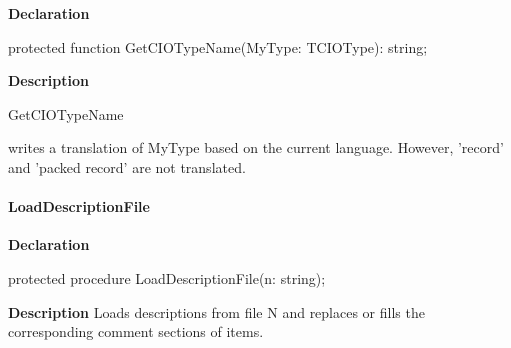 \documentclass{report}
\newif\ifpdf
\begin{document}
\label{PasDoc_Gen.TDocGenerator-GetCIOTypeName}
\begin{list}{}{
\setlength{\itemindent}{0cm}
\setlength{\listparindent}{0cm}
\setlength{\leftmargin}{\evensidemargin}
\addtolength{\leftmargin}{\tmplength}
\settowidth{\labelsep}{X}
\addtolength{\leftmargin}{\labelsep}
\setlength{\labelwidth}{\tmplength}
}
\item[\textbf{Declaration}\hfill]
\ifpdf
\begin{flushleft}
\fi
\begin{ttfamily}
protected function GetCIOTypeName(MyType: TCIOType): string;\end{ttfamily}

\ifpdf
\end{flushleft}
\fi

\par
\item[\textbf{Description}]
\begin{ttfamily}GetCIOTypeName\end{ttfamily} writes a translation of MyType based on the current language. However, 'record' and 'packed record' are not translated.

\end{list}
\paragraph*{LoadDescriptionFile}\hspace*{\fill}

\label{PasDoc_Gen.TDocGenerator-LoadDescriptionFile}
\begin{list}{}{
\setlength{\itemindent}{0cm}
\setlength{\listparindent}{0cm}
\setlength{\leftmargin}{\evensidemargin}
\addtolength{\leftmargin}{\tmplength}
\settowidth{\labelsep}{X}
\addtolength{\leftmargin}{\labelsep}
\setlength{\labelwidth}{\tmplength}
}
\item[\textbf{Declaration}\hfill]
\ifpdf
\begin{flushleft}
\fi
\begin{ttfamily}
protected procedure LoadDescriptionFile(n: string);\end{ttfamily}

\ifpdf
\end{flushleft}
\fi

\par
\item[\textbf{Description}]
Loads descriptions from file N and replaces or fills the corresponding comment sections of items.

\end{list}
\end{document}
